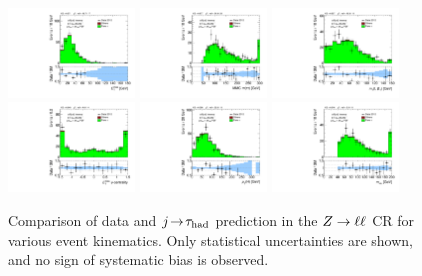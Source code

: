 \begin{figure}[!htpb]
  \includegraphics[width=0.30\textwidth]{figures/analysis/vbf-ZllCR/met-pt-hi}
  \includegraphics[width=0.30\textwidth]{figures/analysis/vbf-ZllCR/mMMC}
  \includegraphics[width=0.30\textwidth]{figures/analysis/vbf-ZllCR/mT-hi} \\
  \includegraphics[width=0.30\textwidth]{figures/analysis/vbf-ZllCR/met-phi-centrality}
  \includegraphics[width=0.30\textwidth]{figures/analysis/vbf-ZllCR/H-pt-hi}
  \includegraphics[width=0.30\textwidth]{figures/analysis/vbf-ZllCR/mvis} \\
  \caption{Comparison of data and $j\!\rightarrow\!\tau_\text{had}$ prediction in the $Z \rightarrow \ell\ell$ CR for various event kinematics. Only statistical uncertainties are shown, and no sign of systematic bias is observed.}
  \label{fig:backgrounds-ZllCR-taus}
\end{figure}

